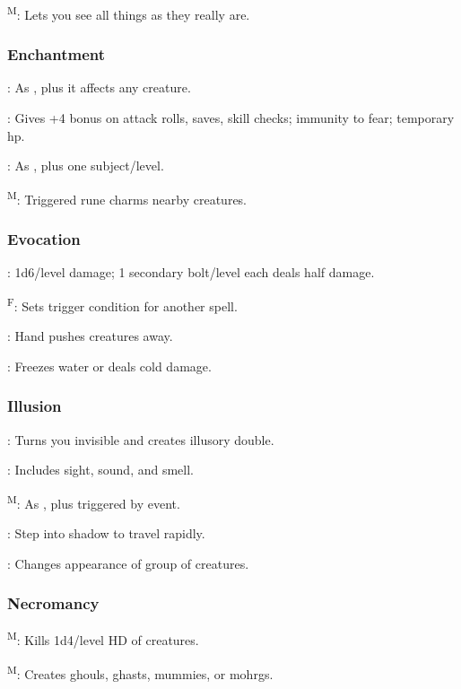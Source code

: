 	\textsuperscript{M}: Lets you see all things as they really are.

\subsubsection{Enchantment}
	: As , plus it affects any creature.

	: Gives +4 bonus on attack rolls, saves, skill checks; immunity to fear; temporary hp.

	: As , plus one subject/level.

	\textsuperscript{M}: Triggered rune charms nearby creatures.

\subsubsection{Evocation}
	: 1d6/level damage; 1 secondary bolt/level each deals half damage.

	\textsuperscript{F}: Sets trigger condition for another spell.

	: Hand pushes creatures away.

	: Freezes water or deals cold damage.

\subsubsection{Illusion}
	: Turns you invisible and creates illusory double.

	: Includes sight, sound, and smell.

	\textsuperscript{M}: As , plus triggered by event.

	: Step into shadow to travel rapidly.

	: Changes appearance of group of creatures.

\subsubsection{Necromancy}
	\textsuperscript{M}: Kills 1d4/level HD of creatures.

	\textsuperscript{M}: Creates ghouls, ghasts, mummies, or mohrgs.

